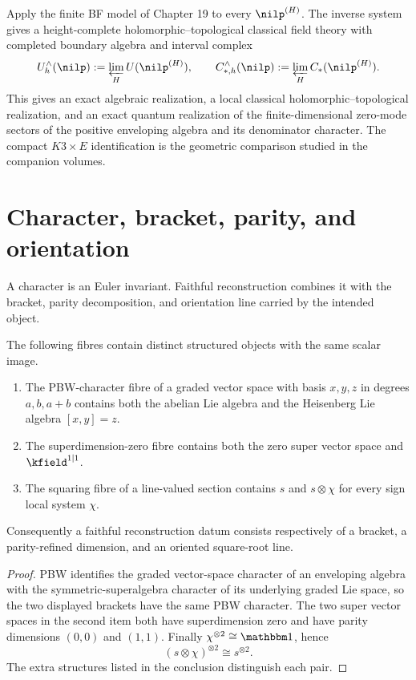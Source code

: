 Apply the finite BF model of Chapter 19 to every $\nilp^{(H)}$. The inverse system gives a height-complete holomorphic--topological classical field theory with completed boundary algebra and interval complex
\[
 U_h^\wedge(\nilp):=\varprojlim_H U(\nilp^{(H)}),
 \qquad
 C_{*,h}^\wedge(\nilp):=\varprojlim_H C_*(\nilp^{(H)}).
\]
This gives an exact algebraic realization, a local classical holomorphic--topological realization, and an exact quantum realization of the finite-dimensional zero-mode sectors of the positive enveloping algebra and its denominator character. The compact $K3\times E$ identification is the geometric comparison studied in the companion volumes.

\chapter{Character, bracket, parity, and orientation}
A character is an Euler invariant.  Faithful reconstruction combines it with the bracket, parity decomposition, and orientation line carried by the intended object.

\begin{theorem}
The following fibres contain distinct structured objects with the same scalar image.
\begin{enumerate}
\item The PBW-character fibre of a graded vector space with basis $x,y,z$ in degrees $a,b,a+b$ contains both the abelian Lie algebra and the Heisenberg Lie algebra $[x,y]=z$.
\item The superdimension-zero fibre contains both the zero super vector space and $\kfield^{1|1}$.
\item The squaring fibre of a line-valued section contains $s$ and $s\otimes\chi$ for every sign local system $\chi$.
\end{enumerate}
Consequently a faithful reconstruction datum consists respectively of a bracket, a parity-refined dimension, and an oriented square-root line.
\end{theorem}
\begin{proof}
PBW identifies the graded vector-space character of an enveloping algebra with the symmetric-superalgebra character of its underlying graded Lie space, so the two displayed brackets have the same PBW character.  The two super vector spaces in the second item both have superdimension zero and have parity dimensions $(0,0)$ and $(1,1)$.  Finally $\chi^{\otimes2}\cong\mathbbm1$, hence
\[
 (s\otimes\chi)^{\otimes2}\cong s^{\otimes2}.
\]
The extra structures listed in the conclusion distinguish each pair.
\end{proof}

